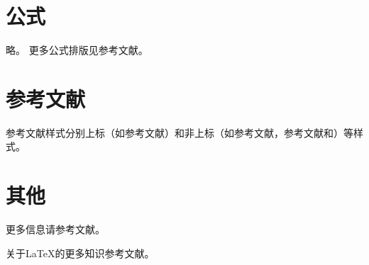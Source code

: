 \section{公式}\label{c1sec:equation}

略。
更多公式排版见参考文献\cite{latexlive}。


\section{参考文献}\label{c1sec:reference}

参考文献样式分别上标（如参考文献）和非上标（如参考文献\cite{BITthesis,latexlive}，参考文献\cite{BITthesis}和\cite{latexlive}）等样式。


\section{其他}\label{c1sec:other}

更多信息请参考文献\cite{BITthesis}。

关于LaTeX的更多知识参考文献\cite{LaTeX2e介绍}。